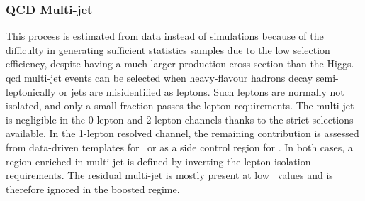 \subsubsection{QCD Multi-jet}
This process is estimated from data instead of simulations because of the difficulty in generating sufficient statistics samples due to the low selection efficiency, despite having a much larger production cross section than the Higgs. \gls{qcd} multi-jet events can be selected when heavy-flavour hadrons decay semi-leptonically or jets are misidentified as leptons. Such leptons are normally not isolated, and only a small fraction passes the lepton requirements. The multi-jet is negligible in the 0-lepton and 2-lepton channels thanks to the strict selections available. In the 1-lepton resolved channel, the remaining contribution is assessed from data-driven templates for \vhb\ or as a side control region for \vhc. In both cases, a region enriched in multi-jet is defined by inverting the lepton isolation requirements. The residual multi-jet is mostly present at low \ptv\ values and is therefore ignored in the boosted regime.

